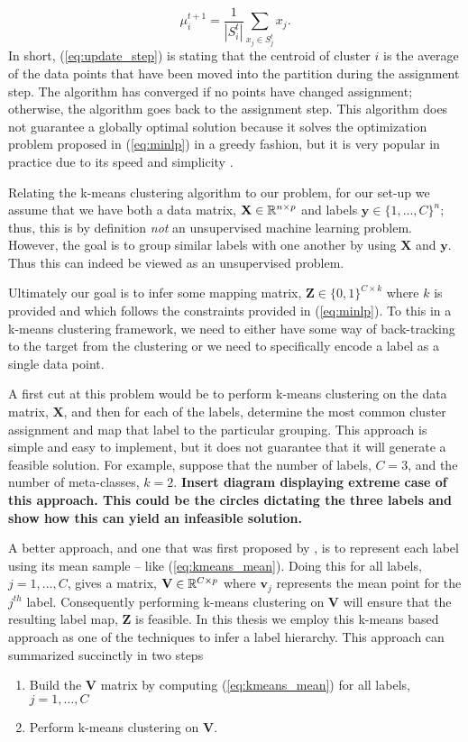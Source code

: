 \documentclass[../thesis.tex]{subfiles}
\begin{document}
\begin{equation}
    \label{eq:update_step}
    \mu_i^{t+1} = \frac{1}{|S_i^t|} \sum_{x_j \in S_j^t} x_j.
\end{equation}
In short, (\ref{eq:update_step}) is stating that the centroid of cluster $i$ is the average of the data points that have been moved into the partition during the assignment step. The algorithm has converged if no points have changed assignment; otherwise, the algorithm goes back to the assignment step. This algorithm does not guarantee a globally optimal solution because it solves the optimization problem proposed in (\ref{eq:minlp}) in a greedy fashion, but it is very popular in practice due to its speed and simplicity \cite{hartigan1979algorithm} \cite{jain2010data}.

Relating the k-means clustering algorithm to our problem, for our set-up we assume that we have both a data matrix, $\mathbf{X} \in \mathbb{R}^{n \times p}$ and labels $\mathbf{y} \in \{1, \ldots, C\}^n$; thus, this is by definition \textit{not} an unsupervised machine learning problem. However, the goal is to group similar labels with one another by using $\mathbf{X}$ and $\mathbf{y}$. Thus this can indeed be viewed as an unsupervised problem. 

Ultimately our goal is to infer some mapping matrix, $\mathbf{Z} \in \{0, 1\}^{C \times k}$ where $k$ is provided and which follows the constraints provided in (\ref{eq:minlp}). To this in a k-means clustering framework, we need to either have some way of back-tracking to the target from the clustering or we need to specifically encode a label as a single data point. 

A first cut at this problem would be to perform k-means clustering on the data matrix, $\mathbf{X}$, and then for each of the labels, determine the most common cluster assignment and map that label to the particular grouping. This approach is simple and easy to implement, but it does not guarantee that it will generate a feasible solution. For example, suppose that the number of labels, $C = 3$, and the number of meta-classes, $k=2$. \textbf{Insert diagram displaying extreme case of this approach. This could be the circles dictating the three labels and show how this can yield an infeasible solution.}

A better approach, and one that was first proposed by \cite{vural2004hierarchical}, is to represent each label using its mean sample -- like (\ref{eq:kmeans_mean}). Doing this for all labels, $j = 1, \ldots, C$, gives a matrix, $\mathbf{V} \in \mathbb{R}^{C \times p}$ where $\mathbf{v}_j$ represents the mean point for the $j^{th}$ label. Consequently performing k-means clustering on $\mathbf{V}$ will ensure that the resulting label map, $\mathbf{Z}$ is feasible. In this thesis we employ this k-means based approach as one of the techniques to infer a label hierarchy. This approach can summarized succinctly in two steps
\begin{enumerate}
    \item Build the $\mathbf{V}$ matrix by computing (\ref{eq:kmeans_mean}) for all labels, $j = 1, \ldots, C$
    \item Perform k-means clustering on $\mathbf{V}$.
\end{enumerate}
\end{document}
